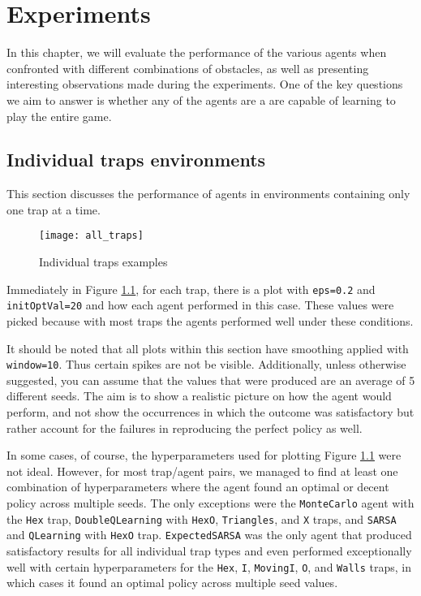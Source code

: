 \chapter{Experiments}
\label{experiments_chapter}
In this chapter, we will evaluate the performance of the various agents when confronted with different combinations of obstacles, as well as presenting interesting observations made during the experiments. One of the key questions we aim to answer is whether any of the agents are a are capable of learning to play the entire game.

\section{Individual traps environments}
This section discusses the performance of agents in environments containing only one trap at a time.

\begin{figure}[h]
    \centering
    \texttt{[image: all\_traps]}
    \caption{Individual traps examples}
    \label{fig:all_traps}
\end{figure}

Immediately in Figure \ref{fig:all_traps}, for each trap, there is a plot with \texttt{eps=0.2} and \texttt{initOptVal=20} and how each agent performed in this case. These values were picked because with most traps the agents performed well under these conditions.

It should be noted that all plots within this section have smoothing applied with \texttt{window=10}. Thus certain spikes are not be visible. Additionally, unless otherwise suggested, you can assume that the values that were produced are an average of 5 different seeds. The aim is to show a realistic picture on how the agent would perform, and not show the occurrences in which the outcome was satisfactory but rather account for the failures in reproducing the perfect policy as well.

In some cases, of course, the hyperparameters used for plotting Figure \ref{fig:all_traps} were not ideal. However, for most trap/agent pairs, we managed to find at least one combination of hyperparameters where the agent found an optimal or decent policy across multiple seeds. The only exceptions were the \texttt{MonteCarlo} agent with the \texttt{Hex} trap, \texttt{DoubleQLearning} with \texttt{HexO}, \texttt{Triangles}, and \texttt{X} traps, and \texttt{SARSA} and \texttt{QLearning} with \texttt{HexO} trap. \texttt{ExpectedSARSA} was the only agent that produced satisfactory results for all individual trap types and even performed exceptionally well with certain hyperparameters for the \texttt{Hex}, \texttt{I}, \texttt{MovingI}, \texttt{O}, and \texttt{Walls} traps, in which cases it found an optimal policy across multiple seed values.

